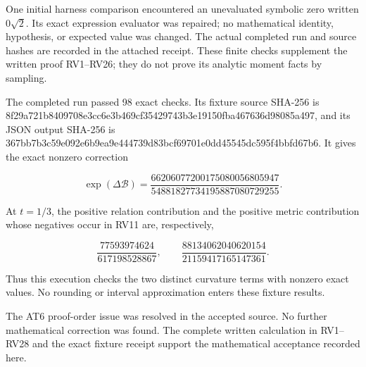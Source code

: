 One initial harness comparison encountered an unevaluated symbolic zero written \(0\sqrt2\). Its exact expression evaluator was repaired; no mathematical identity, hypothesis, or expected value was changed. The actual completed run and source hashes are recorded in the attached receipt. These finite checks supplement the written proof RV1--RV26; they do not prove its analytic moment facts by sampling.

The completed run passed 98 exact checks. Its fixture source SHA-256 is 8f29a721b8409708e3cc6e3b469cf35429743b3e19150fba467636d98085a497, and its JSON output SHA-256 is 367bb7b3c59e092e6b9ea9e444739d83bcf69701e0dd45545dc595f4bbfd67b6. It gives the exact nonzero correction

\[
\exp(\Delta\mathcal B)
=\frac{66206077200175080056805947}{54881827734195887080729255}.
\tag{RV27}
\]

At \(t=1/3\), the positive relation contribution and the positive metric contribution whose negatives occur in RV11 are, respectively,

\[
\frac{77593974624}{617198528867},\qquad
\frac{88134062040620154}{21159417165147361}.
\tag{RV28}
\]

Thus this execution checks the two distinct curvature terms with nonzero exact values. No rounding or interval approximation enters these fixture results.

The AT6 proof-order issue was resolved in the accepted source. No further mathematical correction was found. The complete written calculation in RV1--RV28 and the exact fixture receipt support the mathematical acceptance recorded here.

